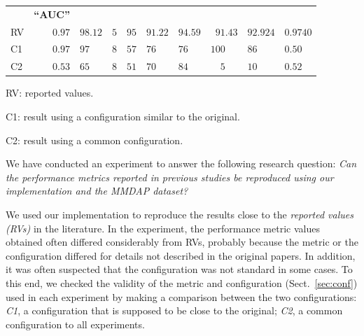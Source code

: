 \documentclass[letterpaper, 10 pt, conference]{ieeeconf}  %
\begin{document}
\begin{table}[t]
\begin{threeparttable}[b]
\begin{tabular}{|l|r|r|r | r | r|r|r|r|r|}
        & \multirow{2}{4.75em}{\bf ``AUC''}
        \\
        & & & & & & & & & \\
        \hline
        \hline
        RV & $0.97$ & $98.12$ & $5$ 
        & $95$ 
        & $91.22$ & $94.59$ & $91.43$ & $92.924$ & $0.9740$ \\
        \hline
        C1 & $0.97$ & $97\phantom{.12}$ & $8$ 
        & $57$ 
        & $76\phantom{.22}$ & $76\phantom{.59}$ & $100\phantom{.43}$ & $86\phantom{.924}$ & $0.50\phantom{40}$ \\
        \hline
        C2 & $0.53$ & $65\phantom{.12}$ & $8$ 
        & $51$ 
        & $70\phantom{.22}$ & $84\phantom{.59}$ & $5\phantom{.43}$ & $10\phantom{.924}$ & $0.52\phantom{40}$ \\
        \hline
    \end{tabular}
    \begin{tablenotes}
        \item RV: reported values.
        \item C1: result using a configuration similar to the original.
        \item C2: result using a common configuration.
    \end{tablenotes}
\end{threeparttable}
\end{table}

We have conducted an experiment to answer the following research question:
\emph{Can the performance metrics reported in previous studies be reproduced using our implementation and the MMDAP dataset?}

We used our implementation to reproduce the results close to the \emph{reported values (RVs)} in the literature.
In the experiment, the performance metric values obtained often differed considerably from RVs, probably because the metric or the configuration differed for details not described in the original papers.
In addition, it was often suspected that the configuration was not standard in some cases.
To this end, we checked the validity of the metric and configuration (Sect.~\ref{sec:conf}) used in each experiment by making a comparison between the two configurations:
\emph{C1}, a configuration that is supposed to be close to the original;
\emph{C2}, a common configuration to all experiments.
\end{document}
